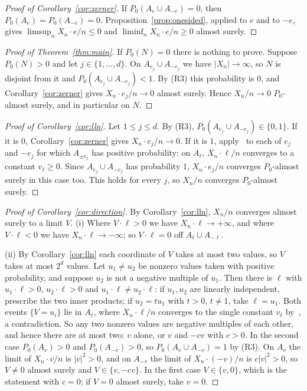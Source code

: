 \documentclass[11pt]{amsart}
\theoremstyle{remark}
\begin{document}
\begin{proof}[Proof of Corollary~\ref{cor:zerner}]
If $P_0(A_e\cup A_{-e})=0$, then $P_0(A_e)=P_0(A_{-e})=0$. Proposition~\ref{prop:onesided}, applied to $e$ and to $-e$,
gives $\limsup_nX_n\cdot e/n\le0$ and $\liminf_nX_n\cdot e/n\ge0$ almost surely.
\end{proof}

\begin{proof}[Proof of Theorem~\ref{thm:main}]
If $P_0(N)=0$ there is nothing to prove. Suppose $P_0(N)>0$ and let $j\in\{1,\dots,d\}$. On $A_{e_j}\cup A_{-e_j}$ we
have $|X_n|\to\infty$, so $N$ is disjoint from it and $P_0(A_{e_j}\cup A_{-e_j})<1$. By (R3) this probability is $0$,
and Corollary~\ref{cor:zerner} gives $X_n\cdot e_j/n\to0$ almost surely. Hence $X_n/n\to0$ $P_0$-almost surely, and in
particular on $N$.
\end{proof}

\begin{proof}[Proof of Corollary~\ref{cor:lln}]
Let $1\le j\le d$. By (R3), $P_0(A_{e_j}\cup A_{-e_j})\in\{0,1\}$. If it is $0$, Corollary~\ref{cor:zerner} gives
$X_n\cdot e_j/n\to0$. If it is $1$, apply~\cite[Theorem 4.6]{KZ13} to each of $e_j$ and $-e_j$ for which
$A_{\pm e_j}$ has positive probability: on $A_{\ell}$, $X_n\cdot\ell/n$ converges to a constant $v_\ell\ge0$. Since
$A_{e_j}\cup A_{-e_j}$ has probability $1$, $X_n\cdot e_j/n$ converges $P_0$-almost surely in this case too. This holds
for every $j$, so $X_n/n$ converges $P_0$-almost surely.
\end{proof}

\begin{proof}[Proof of Corollary~\ref{cor:direction}]
By Corollary~\ref{cor:lln}, $X_n/n$ converges almost surely to a limit $V$. (i) Where $V\cdot\ell>0$ we have
$X_n\cdot\ell\to+\infty$, and where $V\cdot\ell<0$ we have $X_n\cdot\ell\to-\infty$; so $V\cdot\ell=0$ off
$A_\ell\cup A_{-\ell}$.

(ii) By Corollary~\ref{cor:lln} each coordinate of $V$ takes at most two values, so $V$ takes at most $2^d$ values. Let
$u_1\ne u_2$ be nonzero values taken with positive probability, and suppose $u_2$ is not a negative multiple of $u_1$.
Then there is $\ell$ with $u_1\cdot\ell>0$, $u_2\cdot\ell>0$ and $u_1\cdot\ell\ne u_2\cdot\ell$: if $u_1,u_2$ are
linearly independent, prescribe the two inner products; if $u_2=tu_1$ with $t>0$, $t\ne1$, take $\ell=u_1$. Both events
$\{V=u_i\}$ lie in $A_\ell$, where $X_n\cdot\ell/n$ converges to the single constant $v_\ell$
by~\cite[Theorem 4.6]{KZ13}, a contradiction. So any two nonzero values are negative multiples of each other, and
hence there are at most two: $v$ alone, or $v$ and $-cv$ with $c>0$. In the second case $P_0(A_v)>0$ and
$P_0(A_{-v})>0$, so $P_0(A_v\cup A_{-v})=1$ by (R3). On $A_v$ the limit of $X_n\cdot v/n$ is
$|v|^2>0$, and on $A_{-v}$ the limit of $X_n\cdot(-v)/n$ is $c|v|^2>0$, so $V\ne0$ almost surely and
$V\in\{v,-cv\}$. In the first case $V\in\{v,0\}$, which is the statement with $c=0$; if $V=0$ almost surely, take
$v=0$.
\end{proof}
\end{document}
